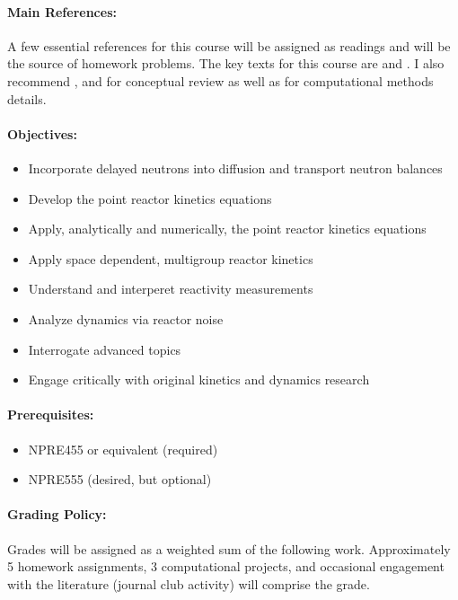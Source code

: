 \documentclass[11pt]{article}
\begin{document}
\paragraph{Main References:}
A few essential references for this course will be assigned as readings and 
will be the source of homework problems. The key texts for this course are
\cite{ott_introductory_1985} and
\cite{hetrick_dynamics_1993}.
I also recommend 
\cite{stacey_nuclear_2007}, \cite{bell_nuclear_1970} and
\cite{duderstadt_transport_1979} for conceptual review as well as
\cite{lewis_computational_1993} for computational methods details.

\renewcommand{\refname}{\normalfont\selectfont\normalsize}


\paragraph{Objectives:}
\begin{itemize}
\item Incorporate delayed neutrons into diffusion and transport neutron balances
\item Develop the point reactor kinetics equations
\item Apply, analytically and numerically, the point reactor kinetics equations
\item Apply space dependent, multigroup reactor kinetics
\item Understand and interperet reactivity measurements
\item Analyze dynamics via reactor noise
\item Interrogate advanced topics 
\item Engage critically with original kinetics and dynamics research
\end{itemize}

\paragraph{Prerequisites:}
\begin{itemize}
        \item NPRE455 or equivalent (required) 
        \item NPRE555 (desired, but optional)
\end{itemize}

\paragraph{Grading Policy:} Grades will be assigned as a weighted sum of the
following work. Approximately 5 homework assignments, 3 computational projects, 
and occasional engagement with the literature (journal club activity) will comprise the 
grade.
\end{document}

